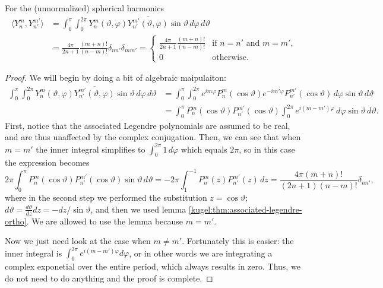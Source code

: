 \begin{theorem} For the (unnormalized) spherical harmonics
  \label{kugel:thm:spherical-harmonics-ortho}
  \begin{align*}
    \langle Y^m_n, Y^{m'}_{n'} \rangle
    &= \int_{0}^\pi \int_0^{2\pi}
      Y^m_n(\vartheta, \varphi) \overline{Y^{m'}_{n'}(\vartheta, \varphi)}
      \sin \vartheta \, d\varphi \, d\vartheta
    \\
    &= \frac{4\pi}{2n + 1} \frac{(m + n)!}{(n - m)!} \delta_{nn'} \delta_{mm'}
    = \begin{cases}
      \frac{4\pi}{2n + 1} \frac{(m + n)!}{(n - m)!}
        & \text{if } n = n' \text{ and } m = m', \\
      0 & \text{otherwise}.
    \end{cases}
  \end{align*}
\end{theorem}
\begin{proof}
  We will begin by doing a bit of algebraic maipulaiton:
  \begin{align*}
    \int_{0}^\pi \int_0^{2\pi}
      Y^m_n(\vartheta, \varphi) \overline{Y^{m'}_{n'}(\vartheta, \varphi)}
      \sin \vartheta \, d\varphi \, d\vartheta
    &= \int_{0}^\pi \int_0^{2\pi}
      e^{im\varphi} P^m_n(\cos \vartheta)
      e^{-im'\varphi} P^{m'}_{n'}(\cos \vartheta)
      \, d\varphi \sin \vartheta \, d\vartheta
    \\
    &= \int_{0}^\pi
      P^m_n(\cos \vartheta) P^{m'}_{n'}(\cos \vartheta)
      \int_0^{2\pi} e^{i(m - m')\varphi}
      \, d\varphi \sin \vartheta \, d\vartheta
      .
  \end{align*}
  First, notice that the associated Legendre polynomials are assumed to be real,
  and are thus unaffected by the complex conjugation. Then, we can see that when
  $m = m'$ the inner integral simplifies to $\int_0^{2\pi} 1 \, d\varphi$ which
  equals $2\pi$, so in this case the expression becomes
  \begin{equation*}
    2\pi \int_{0}^\pi
      P^m_n(\cos \vartheta) P^{m'}_{n'}(\cos \vartheta)
    \sin \vartheta \, d\vartheta
    = -2\pi \int_{1}^{-1} P^m_n(z) P^{m'}_{n'}(z) \, dz
    = \frac{4\pi(m + n)!}{(2n + 1)(n - m)!} \delta_{nn'},
  \end{equation*}
  where in the second step we performed the substitution $z = \cos\vartheta$;
  $d\vartheta = \frac{d\vartheta}{dz} dz= - dz / \sin \vartheta$, and then we
  used lemma \ref{kugel:thm:associated-legendre-ortho}. We are allowed to use
  the lemma because $m = m'$.

  Now we just need look at the case when $m \neq m'$. Fortunately this is
  easier: the inner integral is $\int_0^{2\pi} e^{i(m - m')\varphi} d\varphi$,
  or in other words we are integrating a complex exponetial over the entire
  period, which always results in zero. Thus, we do not need to do anything and
  the proof is complete.
\end{proof}

